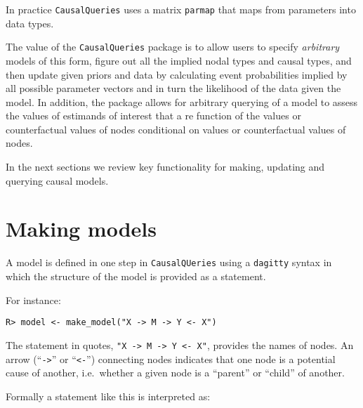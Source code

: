 \documentclass[
  11pt,
  article]{jss}
\begin{document}
In practice \texttt{CausalQueries} uses a matrix \texttt{parmap} that
maps from parameters into data types.

The value of the \texttt{CausalQueries} package is to allow users to
specify \emph{arbitrary} models of this form, figure out all the implied
nodal types and causal types, and then update given priors and data by
calculating event probabilities implied by all possible parameter
vectors and in turn the likelihood of the data given the model. In
addition, the package allows for arbitrary querying of a model to assess
the values of estimands of interest that a re function of the values or
counterfactual values of nodes conditional on values or counterfactual
values of nodes.

In the next sections we review key functionality for making, updating
and querying causal models.

\hypertarget{sec-make}{%
\section{Making models}\label{sec-make}}

A model is defined in one step in \texttt{CausalQUeries} using a
\texttt{dagitty} syntax in which the structure of the model is provided
as a statement.

For instance:

\begin{verbatim}
R> model <- make_model("X -> M -> Y <- X")
\end{verbatim}

The statement in quotes,
\texttt{"X\ -\textgreater{}\ M\ -\textgreater{}\ Y\ \textless{}-\ X"},
provides the names of nodes. An arrow (``\texttt{-\textgreater{}}'' or
``\texttt{\textless{}-}'') connecting nodes indicates that one node is a
potential cause of another, i.e.~whether a given node is a ``parent'' or
``child'' of another.

Formally a statement like this is interpreted as:
\end{document}
